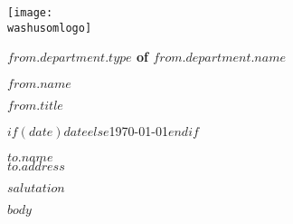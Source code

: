 \documentclass{article}
\begin{document}
\texttt{[image: \\washusomlogo]} \bigskip

\hspace{0.4in}\textbf{$from.department.type$ of $from.department.name$} \bigskip

\hspace{0.4in}\textbf{$from.name$} \par
\hspace{0.4in}\emph{$from.title$} \vspace{4\baselineskip}

$if(date)$$date$$else$\today$endif$ \vspace{3\baselineskip}

$to.name$ \\
$to.address$ \bigskip

$salutation$ \bigskip

$body$ \bigskip
\end{document}
